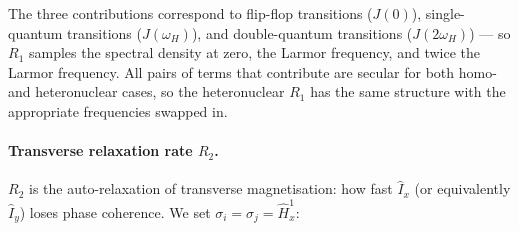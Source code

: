 \documentclass[notitlepage,11pt]{article}
\begin{document}
The three contributions correspond to flip-flop transitions ($J(0)$), single-quantum transitions ($J(\omega_H)$), and double-quantum transitions ($J(2\omega_H)$) — so $R_1$ samples the spectral density at zero, the Larmor frequency, and twice the Larmor frequency. All pairs of terms that contribute are secular for both homo- and heteronuclear cases, so the heteronuclear $R_1$ has the same structure with the appropriate frequencies swapped in.

\paragraph{Transverse relaxation rate $R_2$.} $R_2$ is the auto-relaxation of transverse magnetisation: how fast $\hat{I}_x$ (or equivalently $\hat{I}_y$) loses phase coherence. We set $\sigma_i=\sigma_j=\hat{H}^1_x$:
\end{document}
